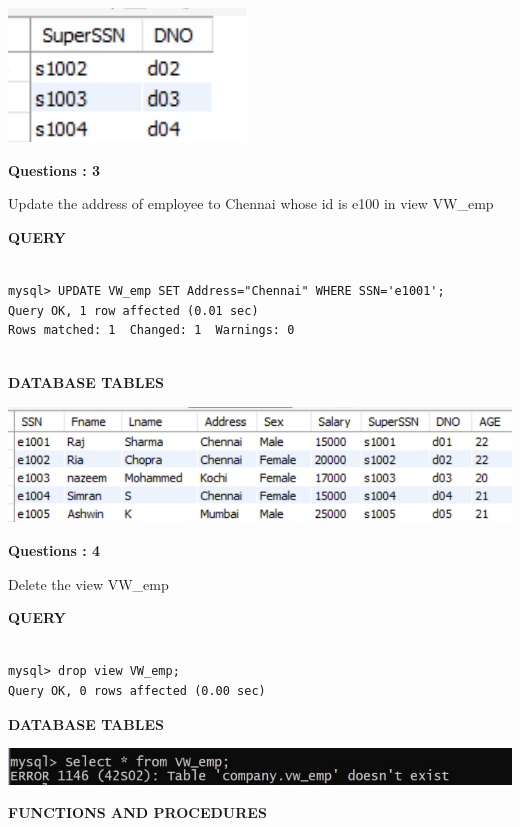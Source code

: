 \documentclass[a4paper,12pt]{report}
\begin{document}
\includegraphics[scale=1]{VIEW2.png}
\begin{flushleft}
    \textbf{Questions : 3}
\end{flushleft}
Update the address of employee to Chennai whose id is e100 in view VW\_emp
	\begin{flushleft}
		\textbf{QUERY }
	\end{flushleft}
 \begin{verbatim}
 
mysql> UPDATE VW_emp SET Address="Chennai" WHERE SSN='e1001';
Query OK, 1 row affected (0.01 sec)
Rows matched: 1  Changed: 1  Warnings: 0


\end{verbatim}
\begin{flushleft}
		\textbf{DATABASE TABLES} 
\end{flushleft} 

\includegraphics[scale=1]{VIEW3.png}
\begin{flushleft}
    \textbf{Questions : 4}
\end{flushleft}
Delete the view VW\_emp
	\begin{flushleft}
		\textbf{QUERY }
	\end{flushleft}
 \begin{verbatim}
 
mysql> drop view VW_emp;
Query OK, 0 rows affected (0.00 sec)

\end{verbatim}
\begin{flushleft}
		\textbf{DATABASE TABLES} 
\end{flushleft} 

\includegraphics[scale=0.8]{VIEW4.png}
\newpage
\begin{center}
		\large\textbf{FUNCTIONS AND PROCEDURES}
	\end{center}
	
\end{document}
